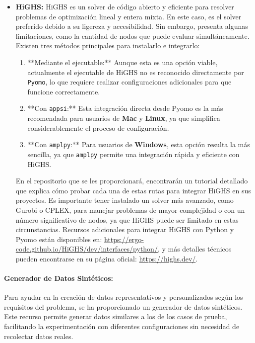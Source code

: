 \documentclass[12pt]{article}
\begin{document}
\begin{itemize}
    \item \textbf{HiGHS:} HiGHS es un solver de código abierto y eficiente para resolver problemas de optimización lineal y entera mixta. En este caso, es el solver preferido debido a su ligereza y accesibilidad. Sin embargo, presenta algunas limitaciones, como la cantidad de nodos que puede evaluar simultáneamente. Existen tres métodos principales para instalarlo e integrarlo:
    \begin{enumerate}
        \item **Mediante el ejecutable:** Aunque esta es una opción viable, actualmente el ejecutable de HiGHS no es reconocido directamente por \texttt{Pyomo}, lo que requiere realizar configuraciones adicionales para que funcione correctamente.
        \item **Con \texttt{appsi}:** Esta integración directa desde Pyomo es la más recomendada para usuarios de \textbf{Mac} y \textbf{Linux}, ya que simplifica considerablemente el proceso de configuración.
        \item **Con \texttt{amplpy}:** Para usuarios de \textbf{Windows}, esta opción resulta la más sencilla, ya que \texttt{amplpy} permite una integración rápida y eficiente con HiGHS.
    \end{enumerate}
    En el repositorio que se les proporcionará, encontrarán un tutorial detallado que explica cómo probar cada una de estas rutas para integrar HiGHS en sus proyectos. Es importante tener instalado un solver más avanzado, como Gurobi o CPLEX, para manejar problemas de mayor complejidad o con un número significativo de nodos, ya que HiGHS puede ser limitado en estas circunstancias. Recursos adicionales para integrar HiGHS con Python y Pyomo están disponibles en: \url{https://ergo-code.github.io/HiGHS/dev/interfaces/python/}, y más detalles técnicos pueden encontrarse en su página oficial: \url{https://highs.dev/}.
\end{itemize}

\paragraph{Generador de Datos Sintéticos:}

Para ayudar en la creación de datos representativos y personalizados según los requisitos del problema, se ha proporcionado un generador de datos sintéticos. Este recurso permite generar datos similares a los de los casos de prueba, facilitando la experimentación con diferentes configuraciones sin necesidad de recolectar datos reales. 
\end{document}
